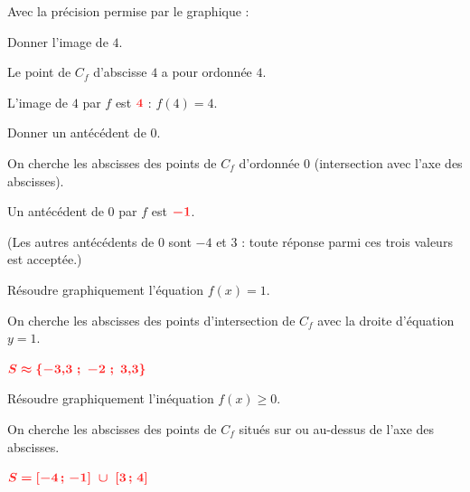 \documentclass[11pt,a4paper]{article}  %
\begin{document}
	Avec la précision permise par le graphique :
	\begin{enumMet}
		\item Donner l'image de $4$. \quad {}
		
		\begin{corrBox}
			Le point de $C_f$ d'abscisse $4$ a pour ordonnée $4$.
			
			L'image de $4$ par $f$ est $\mRouge{4}$ : $f(4)=4$.
		\end{corrBox}
		
		\item Donner un antécédent de $0$. \quad {}
		
		\begin{corrBox}
			On cherche les abscisses des points de $C_f$ d'ordonnée $0$ (intersection avec l'axe des abscisses).
			
			Un antécédent de $0$ par $f$ est $\mRouge{-1}$.
			
			(Les autres antécédents de $0$ sont $-4$ et $3$ : toute réponse parmi ces trois valeurs est acceptée.)
		\end{corrBox}
		
		\item {} Résoudre graphiquement l'équation $f(x)=1$. \quad {}
		
		\begin{corrBox}
			On cherche les abscisses des points d'intersection de $C_f$ avec la droite d'équation $y=1$.
			
			$\mRouge{S\approx\left\{-3{,}3\ ;\ -2\ ;\ 3{,}3\right\}}$
		\end{corrBox}
		
		\item Résoudre graphiquement l'inéquation $f(x)\geqslant 0$. \quad {}
		
		\begin{corrBox}
			On cherche les abscisses des points de $C_f$ situés sur ou au-dessus de l'axe des abscisses.
			
			$\mRouge{S=\left[-4\,;\,-1\right]\ \cup\ \left[3\,;\,4\right]}$
		\end{corrBox}
	\end{enumMet}
	
\end{document}
